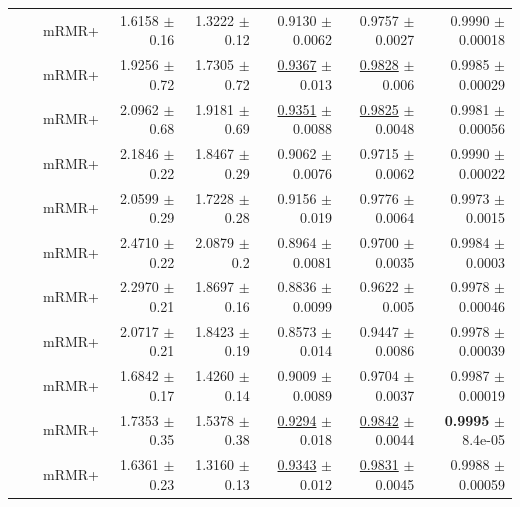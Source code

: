 \begin{longtable}{llp{}rrrrr}
 &  & mRMR+ & 1.6158 {\scriptsize $\pm$ 0.16} & 1.3222 {\scriptsize $\pm$ 0.12} & 0.9130 {\scriptsize $\pm$ 0.0062} & 0.9757 {\scriptsize $\pm$ 0.0027} & 0.9990 {\scriptsize $\pm$ 0.00018} \\
 &  & mRMR+ & 1.9256 {\scriptsize $\pm$ 0.72} & 1.7305 {\scriptsize $\pm$ 0.72} & \underline{0.9367} {\scriptsize $\pm$ 0.013} & \underline{0.9828} {\scriptsize $\pm$ 0.006} & 0.9985 {\scriptsize $\pm$ 0.00029} \\
 &  & mRMR+ & 2.0962 {\scriptsize $\pm$ 0.68} & 1.9181 {\scriptsize $\pm$ 0.69} & \underline{0.9351} {\scriptsize $\pm$ 0.0088} & \underline{0.9825} {\scriptsize $\pm$ 0.0048} & 0.9981 {\scriptsize $\pm$ 0.00056} \\
 &  & mRMR+ & 2.1846 {\scriptsize $\pm$ 0.22} & 1.8467 {\scriptsize $\pm$ 0.29} & 0.9062 {\scriptsize $\pm$ 0.0076} & 0.9715 {\scriptsize $\pm$ 0.0062} & 0.9990 {\scriptsize $\pm$ 0.00022} \\
 &  & mRMR+ & 2.0599 {\scriptsize $\pm$ 0.29} & 1.7228 {\scriptsize $\pm$ 0.28} & 0.9156 {\scriptsize $\pm$ 0.019} & 0.9776 {\scriptsize $\pm$ 0.0064} & 0.9973 {\scriptsize $\pm$ 0.0015} \\
 &  & mRMR+ & 2.4710 {\scriptsize $\pm$ 0.22} & 2.0879 {\scriptsize $\pm$ 0.2} & 0.8964 {\scriptsize $\pm$ 0.0081} & 0.9700 {\scriptsize $\pm$ 0.0035} & 0.9984 {\scriptsize $\pm$ 0.0003} \\
 &  & mRMR+ & 2.2970 {\scriptsize $\pm$ 0.21} & 1.8697 {\scriptsize $\pm$ 0.16} & 0.8836 {\scriptsize $\pm$ 0.0099} & 0.9622 {\scriptsize $\pm$ 0.005} & 0.9978 {\scriptsize $\pm$ 0.00046} \\
 &  & mRMR+ & 2.0717 {\scriptsize $\pm$ 0.21} & 1.8423 {\scriptsize $\pm$ 0.19} & 0.8573 {\scriptsize $\pm$ 0.014} & 0.9447 {\scriptsize $\pm$ 0.0086} & 0.9978 {\scriptsize $\pm$ 0.00039} \\
 &  & mRMR+ & 1.6842 {\scriptsize $\pm$ 0.17} & 1.4260 {\scriptsize $\pm$ 0.14} & 0.9009 {\scriptsize $\pm$ 0.0089} & 0.9704 {\scriptsize $\pm$ 0.0037} & 0.9987 {\scriptsize $\pm$ 0.00019} \\
 &  & mRMR+ & 1.7353 {\scriptsize $\pm$ 0.35} & 1.5378 {\scriptsize $\pm$ 0.38} & \underline{0.9294} {\scriptsize $\pm$ 0.018} & \underline{0.9842} {\scriptsize $\pm$ 0.0044} & \textbf{0.9995} {\scriptsize $\pm$ 8.4e-05} \\
 &  & mRMR+ & 1.6361 {\scriptsize $\pm$ 0.23} & 1.3160 {\scriptsize $\pm$ 0.13} & \underline{0.9343} {\scriptsize $\pm$ 0.012} & \underline{0.9831} {\scriptsize $\pm$ 0.0045} & 0.9988 {\scriptsize $\pm$ 0.00059} \\

\end{longtable}
